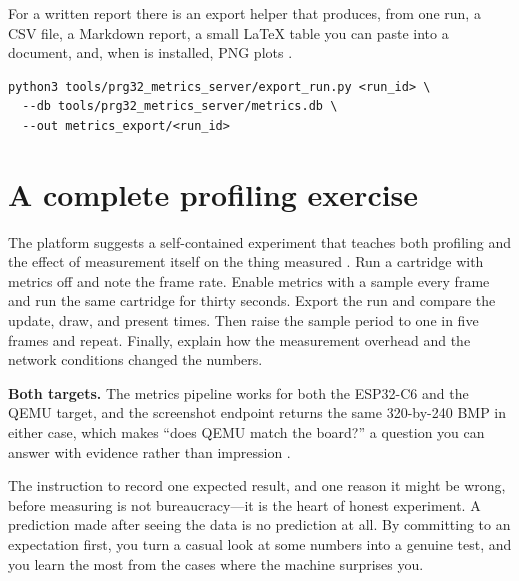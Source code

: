 For a written report there is an export helper that produces, from one run, a CSV
file, a Markdown report, a small \LaTeX{} table you can paste into a document, and,
when  is installed, PNG plots \citep{prg32metrics}.

\begin{lstlisting}[style=bash,caption={Exporting a run into report-ready artefacts.}]
python3 tools/prg32_metrics_server/export_run.py <run_id> \
  --db tools/prg32_metrics_server/metrics.db \
  --out metrics_export/<run_id>
\end{lstlisting}

\section{A complete profiling exercise}

The platform suggests a self-contained experiment that teaches both profiling and
the effect of measurement itself on the thing measured \citep{prg32metrics}. Run a
cartridge with metrics off and note the frame rate. Enable metrics with a sample
every frame and run the same cartridge for thirty seconds. Export the run and
compare the update, draw, and present times. Then raise the sample period to one in
five frames and repeat. Finally, explain how the measurement overhead and the
network conditions changed the numbers.

\begin{prgtargets}
\textbf{Both targets.} The metrics pipeline works for both the ESP32\nobreakdash-C6 and the
QEMU target, and the screenshot endpoint returns the same 320-by-240 BMP in either
case, which makes ``does QEMU match the board?'' a question you can answer with
evidence rather than impression \citep{prg32qemu,prg32scimeasure}.
\end{prgtargets}

\begin{prgaside}
The instruction to record one expected result, and one reason it might be wrong,
before measuring is not bureaucracy---it is the heart of honest experiment. A
prediction made after seeing the data is no prediction at all. By committing to an
expectation first, you turn a casual look at some numbers into a genuine test, and
you learn the most from the cases where the machine surprises you.
\end{prgaside}
